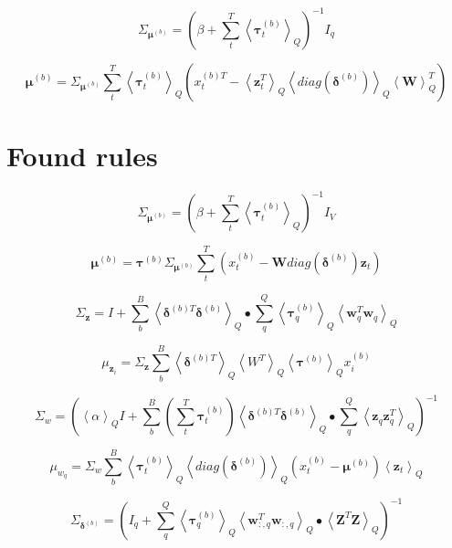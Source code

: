 \documentclass[10pt]{article}
\newcommand{\Angle}[1]{\left \langle #1 \right \rangle}
\newcommand{\Eq}[1]{\Angle{#1}_Q}
\begin{document}
     \begin{equation}
        \Sigma_{\bm{\mu}^{(b)}} = (\beta + \sum_t^T\Eq{\bm{\tau}_t^{(b)}})^{-1} I_q
    \end{equation}

    \begin{equation}
        \bm{\mu}^{(b)} = \Sigma_{\bm{\mu}^{(b)}}\sum_t^T\Eq{\bm{\tau}_t^{(b)}}(x_t^{(b)T} - \Eq{\bm{z}_t^T}\Eq{diag(\bm{\delta}^{(b)})}\Eq{\bm{W}}^{T})
    \end{equation}


    \newpage



\section{Found rules}


    \begin{equation}
        \Sigma_{\bm{\mu}^{(b)}} = (\beta + \sum_t^T\Eq{\bm{\tau}_t^{(b)}})^{-1}I_V
    \end{equation}

    \begin{equation}
        \bm{\mu}^{(b)} = \bm{\tau}^{(b)}\Sigma_{\bm{\mu}^{(b)}} \sum_t^T(x_t^{(b)} - \bm{W}diag(\bm{\delta}^{(b)})\bm{z}_t)
    \end{equation}


    \begin{equation}
        \Sigma_{\bm{z}} = I + \sum_b^B
        \Eq{\bm{\delta}^{(b)T}\bm{\delta}^{(b)}}\bullet\sum_q^Q\Eq{\bm{\tau}_q^{(b)}}\Eq{\bm{w}_q^T\bm{w}_q}
    \end{equation}

    \begin{equation}
        \mu_{\bm{z}_i} = \Sigma_{\bm{z}}\sum_b^B\Eq{\bm{\delta}^{(b)T}}\Eq{W^T}\Eq{\bm{\tau}^{(b)}}x^{(b)}_i
    \end{equation}

    \begin{equation}
        \Sigma_{w} = (\Eq{\alpha}I + \sum_b^B(\sum_t^T\bm{\tau}_t^{(b)})\Eq{\bm{\delta}^{(b)T}\bm{\delta}^{(b)}}\bullet\sum_q^Q\Eq{\bm{z}_q\bm{z}_q^T})^{-1}
    \end{equation}

    \begin{equation}
        \mu_{w_q} = \Sigma_{w}\sum_b^B\Eq{\bm{\tau}_t^{(b)}}\Eq{diag(\bm{\delta}^{(b)})}(x_t^{(b)} - \bm{\mu}^{(b)})\Eq{\bm{z}_t}
    \end{equation}

    \begin{equation}
        \Sigma_{\bm{\delta}^{(b)}} = (I_q + \sum_q^Q\Eq{\bm{\tau}_q^{(b)}}\Eq{\bm{w}_{:,q}^T\bm{w}_{:,q}}\bullet\Eq{\bm{Z}^T\bm{Z}})^{-1}
    \end{equation}
\end{document}
